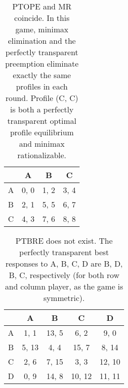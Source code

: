\begin{table}
	\caption{
		PTOPE and MR coincide.
		In this game, minimax elimination and the perfectly transparent preemption eliminate exactly the same profiles in each round.
		Profile (C, C) is both a perfectly transparent optimal profile equilibrium and minimax rationalizable.
	}
	\label{tab:PTOPE-eq-minimax}
	\centering
	\begin{tabular}{|c|c|c|c|}
		\hline
			& A		& B	   & C	  \\
		\hline
		A 		&\cellcolor{gray!70} 0, 0 &\cellcolor{gray!70} 1, 2 &\cellcolor{gray!70} 3, 4 \\
		\hline
		B		&\cellcolor{gray!70} 2, 1 &\cellcolor{gray!20} 5, 5 &\cellcolor{gray!20} 6, 7 \\
		\hline
		C		&\cellcolor{gray!70} 4, 3 &\cellcolor{gray!20} 7, 6 &\cellcolor{gray!00} 8, 8 \\
		\hline
	\end{tabular}
\end{table}


\begin{table}
	\caption{
		PTBRE does not exist.
		The perfectly transparent best responses to A, B, C, D are B, D, B, C, respectively (for both row and column player, as the game is symmetric).
	}
	\label{tab:no-ptbre}
	\centering
	\begin{tabular}{|c|c|c|c|c|}
		\hline
			& A		& B	   & C	 & D	 \\
		\hline
		A 		&\cellcolor{gray!70}  1,  1 &\cellcolor{gray!20} 13,  5 &\cellcolor{gray!70}  6,  2 &\cellcolor{gray!70}  9,  0 \\
		\hline
		B		&\cellcolor{gray!20}  5, 13 &\cellcolor{gray!20}  4,  4 &\cellcolor{gray!20} 15,  7 &\cellcolor{gray!20}  8, 14 \\
		\hline
		C		&\cellcolor{gray!70}  2,  6 &\cellcolor{gray!20}  7, 15 &\cellcolor{gray!70}  3,  3 &\cellcolor{gray!20} 12, 10 \\
		\hline
		D		&\cellcolor{gray!70}  0,  9 &\cellcolor{gray!20} 14,  8 &\cellcolor{gray!20} 10, 12 &\cellcolor{gray!20} 11, 11 \\
		\hline
	\end{tabular}
\end{table}

